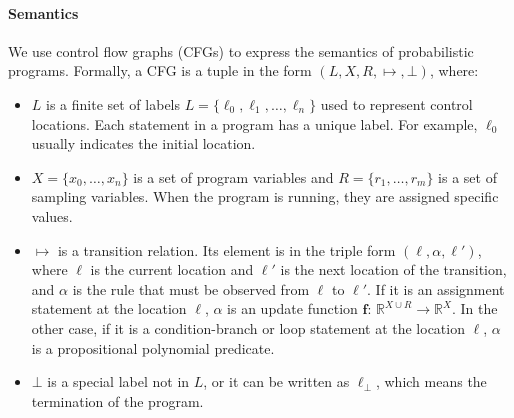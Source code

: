 \documentclass[conference]{IEEEtran}
\begin{document}
\paragraph{Semantics} We use control flow graphs (CFGs) to express the semantics of probabilistic programs. Formally, a CFG is a tuple in the form $(L,X,R,\mapsto,\bot)$, where:
\renewcommand{\labelitemi}{$\vcenter{\hbox{\tiny$\bullet$}}$}
\begin{itemize}
	\item $L$ is a finite set of labels $L=\{\ell_0,\ell_1,\dots,\ell_n\}$ used to represent control locations. Each statement in a program has a unique label. For example, $\ell_0$ usually indicates the initial location.
	
	\item $X=\{x_0,\dots,x_n\}$ is a set of program variables and $R=\{r_1,\dots,r_m\}$ is a set of sampling variables. When the program is running, they are assigned specific values.
	
	\item $\mapsto$ is a transition relation. Its element is in the triple form  $(\ell,\alpha,\ell')$, where $\ell$ is the current location and $\ell'$ is the next location of the transition, and $\alpha$ is the rule that must be observed 
	from $\ell$ to $\ell'$. If it is an assignment statement at the location $\ell$, $\alpha$ is an update function $\bm{f}$: $\mathbb{R}^{X\cup R}\to \mathbb{R}^{X}$. In the other case, if it is a condition-branch or loop statement at the location $\ell$, $\alpha$ is a propositional polynomial predicate.
	
	\item $\bot$ is a special label not in $L$, or it can be written as $\ell_\bot$, which  means the termination of the program.
\end{itemize}
\end{document}
